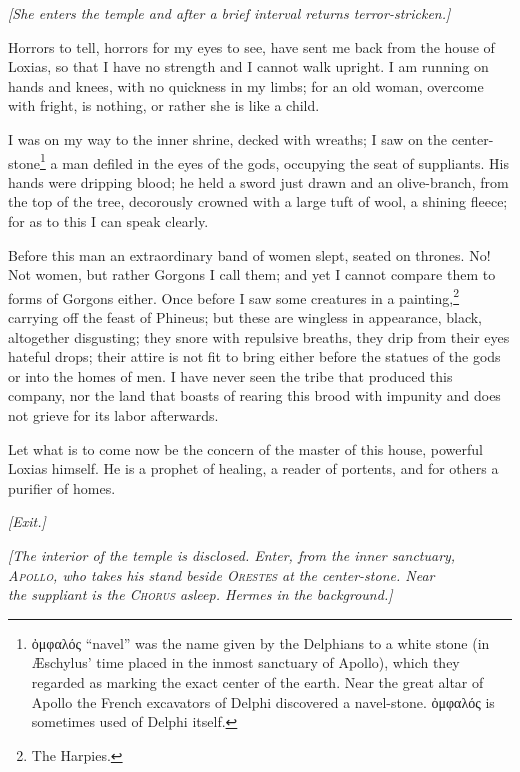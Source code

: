\documentclass[12pt]{article}
\begin{document}
\begin{center}
\textit{[She enters the temple and after a brief interval returns terror-stricken.]}
\end{center}

Horrors to tell, horrors for my eyes to see, have sent me back from the house of Loxias, so that I have no strength and I cannot walk upright. I am running on hands and knees, with no quickness in my limbs; for an old woman, overcome with fright, is nothing, or rather she is like a child.

I was on my way to the inner shrine, decked with wreaths; I saw on the center-stone\footnote{ὀμφαλός ``navel'' was the name given by the Delphians to a white stone (in {\AE}schylus' time placed in the inmost sanctuary of Apollo), which they regarded as marking the exact center of the earth. Near the great altar of Apollo the French excavators of Delphi discovered a navel-stone. ὀμφαλός is sometimes used of Delphi itself.} a man defiled in the eyes of the gods, occupying the seat of suppliants. His hands were dripping blood; he held a sword just drawn and an olive-branch, from the top of the tree, decorously crowned with a large tuft of wool, a shining fleece; for as to this I can speak clearly.

Before this man an extraordinary band of women slept, seated on thrones. No! Not women, but rather Gorgons I call them; and yet I cannot compare them to forms of Gorgons either. Once before I saw some creatures in a painting,\footnote{The Harpies.} carrying off the feast of Phineus; but these are wingless in appearance, black, altogether disgusting; they snore with repulsive breaths, they drip from their eyes hateful drops; their attire is not fit to bring either before the statues of the gods or into the homes of men. I have never seen the tribe that produced this company, nor the land that boasts of rearing this brood with impunity and does not grieve for its labor afterwards.

Let what is to come now be the concern of the master of this house, powerful Loxias himself. He is a prophet of healing, a reader of portents, and for others a purifier of homes.

\begin{center}
\textit{[Exit.]}
\end{center}

\begin{center}
\textit{[The interior of the temple is disclosed. Enter, from the inner sanctuary,\\
\textsc{Apollo,} who takes his stand beside \textsc{Orestes} at the center-stone. Near\\
the suppliant is the \textsc{Chorus} asleep. Hermes in the background.]}
\end{center}
\end{document}

